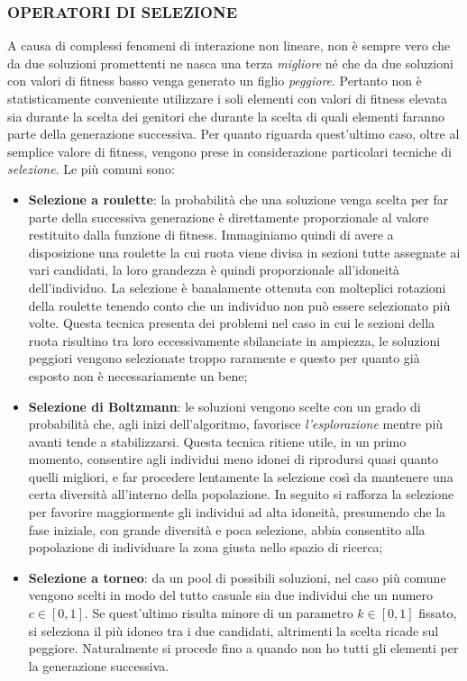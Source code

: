 \documentclass[11pt]{article}
\begin{document}
\subsubsection*{OPERATORI DI SELEZIONE}

A causa di complessi fenomeni di interazione non lineare, non è sempre vero che da due soluzioni promettenti ne nasca una terza \textit{migliore} né che da due soluzioni con valori di fitness basso venga generato un figlio \textit{peggiore}. Pertanto non è statisticamente conveniente utilizzare i soli elementi con valori di fitness elevata sia durante la scelta dei genitori che durante la scelta di quali elementi faranno parte della generazione successiva. Per quanto riguarda quest'ultimo caso, oltre al semplice valore di fitness, vengono prese in considerazione particolari tecniche di \textit{selezione}. Le più comuni sono:

\begin{itemize}
    \item \textbf{Selezione a roulette}: la probabilità che una soluzione venga scelta per far parte della successiva generazione è direttamente proporzionale al valore restituito dalla funzione di fitness. Immaginiamo quindi di avere a disposizione una roulette la cui ruota viene divisa in sezioni tutte assegnate ai vari candidati, la loro grandezza è quindi proporzionale all'idoneità dell'individuo. La selezione è banalamente ottenuta con molteplici rotazioni della roulette tenendo conto che un individuo non può essere selezionato più volte. Questa tecnica presenta dei problemi nel caso in cui le sezioni della ruota risultino tra loro eccessivamente sbilanciate in ampiezza, le soluzioni peggiori vengono selezionate troppo raramente e questo per quanto già esposto non è necessariamente un bene;
    
    \item \textbf{Selezione di Boltzmann}: le soluzioni vengono scelte con un grado di probabilità che, agli inizi dell'algoritmo, favorisce \textit{l'esplorazione} mentre più avanti tende a stabilizzarsi. Questa tecnica ritiene utile, in un primo momento, consentire agli individui meno idonei di riprodursi quasi quanto quelli migliori, e far procedere lentamente la selezione così da mantenere una certa diversità all'interno della popolazione. In seguito si rafforza la selezione per favorire maggiormente gli individui ad alta idoneità, presumendo che la fase iniziale, con grande diversità e poca selezione, abbia consentito alla popolazione di individuare la zona giusta nello spazio di ricerca;
    
    \item \textbf{Selezione a torneo}: da un pool di possibili soluzioni, nel caso più comune vengono scelti in modo del tutto casuale sia due individui che un numero $c \in [0, 1]$. Se quest'ultimo risulta minore di un parametro $k \in [0, 1]$ fissato, si seleziona il più idoneo tra i due candidati, altrimenti la scelta ricade sul peggiore. Naturalmente si procede fino a quando non ho tutti gli elementi per la generazione successiva.
\end{itemize}
\end{document}
